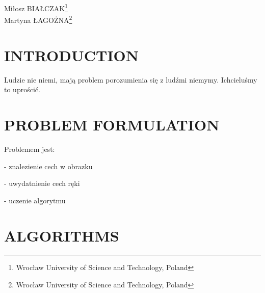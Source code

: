 \documentclass[11pt,a4paper]{article}
\begin{document}
%
%
%
\noindent Mi\l osz BIA\L CZAK\footnote{\noindent Wroc\l aw University of Science and Technology, Poland} \\
%
\noindent Martyna \L AGO\.ZNA\footnote{\noindent Wroc\l aw University of Science and Technology, Poland} \\[7pt]
%






\section{INTRODUCTION}

Ludzie nie niemi, mają problem porozumienia się z ludźmi niemymy. Ichcieluśmy to uprościć.


\section{PROBLEM FORMULATION}

Problemem jest:

- znalezienie cech w obrazku

- uwydatnienie cech ręki

- uczenie algorytmu


\section{ALGORITHMS}
\end{document}
